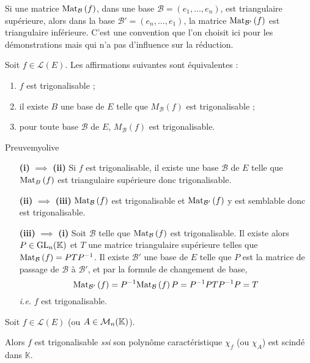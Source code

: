     Si une matrice $\text{Mat}_{\mathcal{B}}\left(f\right)$, dans une base $\mathcal{B} = (e_1, \ldots, e_n)$, est triangulaire supérieure, alors dans la base $\mathcal{B}' = (e_n, \ldots, e_1)$, la matrice $\text{Mat}_{\mathcal{B}'}\left(f\right)$ est triangulaire inférieure. C’est une convention que l’on choisit ici pour les démonstrations mais qui n’a pas d’influence sur la réduction.

    \begin{prop}{}{}
        Soit $f \in \mathcal{L}(E)$. Les affirmations suivantes sont équivalentes :
        \begin{enumerate}
            \item $f$ est trigonalisable ;
            \item il existe $B$ une base de $E$ telle que $M_{\mathcal{B}}(f)$ est trigonalisable ;
            \item pour toute base $\mathcal{B}$ de $E$, $M_{\mathcal{B}}(f)$ est trigonalisable.
        \end{enumerate}
    \end{prop}

    \begin{demo}{Preuve}{myolive}
        \begin{itemize}[leftmargin=2cm]
            \item[\textbf{(i)} $\implies$ \textbf{(ii)}] Si $f$ est trigonalisable, il existe une base $\mathcal{B}$ de $E$ telle que $\text{Mat}_{B}\left(f\right)$ est triangulaire supérieure donc trigonalisable.
            \item[\textbf{(ii)} $\implies$ \textbf{(iii)}] $\text{Mat}_{\mathcal{B}}\left(f\right)$ est trigonalisable et $\text{Mat}_{\mathcal{B}'}\left(f\right)$ y est semblable donc est trigonalisable.
            \item[\textbf{(iii)} $\implies$ \textbf{(i)}] Soit $\mathcal{B}$ telle que $\text{Mat}_{\mathcal{B}}\left(f\right)$ est trigonalisable. Il existe alors $P \in \operatorname{GL}_n(\mathbb{K})$ et $T$ une matrice triangulaire supérieure telles que $\text{Mat}_{\mathcal{B}}\left(f\right) = P T P^{-1}$. Il existe $\mathcal{B}'$ une base de $E$ telle que $P$ est la matrice de passage de $\mathcal{B}$ à $\mathcal{B}'$, et par la formule de changement de base,
            \[ \text{Mat}_{\mathcal{B}'}\left(f\right) = P^{-1} \text{Mat}_{\mathcal{B}}\left(f\right)  P = P^{-1} P T P^{-1} P = T \]   
            \textit{i.e.} $f$ est trigonalisable.
        \end{itemize}
    \end{demo}

    \begin{theo}{}{}
        Soit $f \in \mathcal{L}(E)$ (ou $A \in \mathcal{M}_{n}(\mathbb{K})$). 

        Alors $f$ est trigonalisable \textit{ssi} son polynôme caractéristique $\chi_f$ (ou $\chi_A$) est scindé dans $\mathbb{K}$.
    \end{theo}

